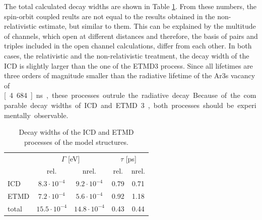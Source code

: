 The total calculated decay widths are shown in Table
\ref{table:arxe_widths_model}. From these numbers, the spin-orbit coupled
reults are not equal to the results obtained in the non-relativistic estimate,
but similar to them. This can be explained by the multitude of channels, which
open at different distances and therefore, the basis of pairs and triples
included in the open channel calculations, differ from each other.
In both cases, the relativistic and
the non-relativistic treatment,
the decay width of the \ac{ICD} is slightly larger than the one of the
\ac{ETMD}3 process. Since all lifetimes are three orders of magnitude smaller
than the radiative lifetime of the Ar3s vacancy of \unit[4.684]{ns},
these processes outrule the radiative decay.
Because of the comparable decay widths of \ac{ICD} and \ac{ETMD}3, both
processes should be experimentally observable.

\begin{table}[bt]
 \centering
 \caption{Decay widths of the ICD and ETMD processes of the model structures.}
 \begin{tabular}{lcccc}
  \toprule
          & \multicolumn{2}{c}{$\Gamma$ [eV]} & \multicolumn{2}{c}{$\tau$ [ps]}\\
          & rel.               & nrel.              & rel. & nrel. \\
  \midrule
   ICD    & $8.3\cdot 10^{-4}$ & $9.2\cdot 10^{-4}$ & 0.79 & 0.71\\
   ETMD   & $7.2\cdot 10^{-4}$ & $5.6\cdot 10^{-4}$ & 0.92 & 1.18\\
   total  & $15.5\cdot 10^{-4}$& $14.8\cdot 10^{-4}$& 0.43 & 0.44\\
  \bottomrule
 \end{tabular}
 \label{table:arxe_widths_model}
\end{table}

